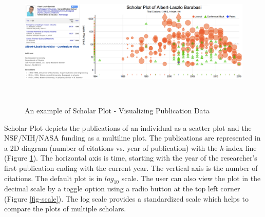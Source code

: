 \begin{figure}
  \centering
  \includegraphics[width=1\textwidth]{figures/fig_publication}
  \caption{An example of Scholar Plot - Visualizing Publication Data}~\label{fig-publication}
\end{figure}


Scholar Plot depicts the publications of an individual as a scatter plot and the NSF/NIH/NASA funding as a multiline plot. The publications are represented in a 2D diagram (number of citations vs. year of publication) with the {\it h}-index line (Figure \ref{fig-publication}). The horizontal axis is time, starting with the year of the researcher's first publication ending with the current year. The vertical axis is the number of citations. The default plot is in $log_{10}$ scale. The user can also view the plot in the decimal scale by a toggle option using a radio button at the top left corner (Figure \ref{fig-scale}). The log scale provides a standardized scale which helps to compare the plots of multiple scholars.



